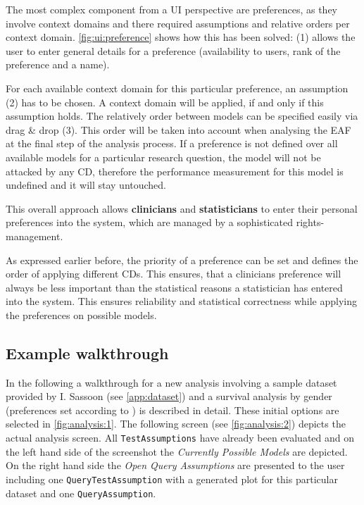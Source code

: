 The most complex component from a \gls{UI} perspective are preferences, as they involve context domains and there required assumptions and relative orders per context domain. \autoref{fig:ui:preference} shows how this has been solved: (1) allows the user to enter general details for a preference (availability to users, rank of the preference and a name). 

For each available context domain for this particular preference, an assumption (2) has to be chosen. A context domain will be applied, if and only if this assumption holds. The relatively order between models can be specified easily via drag \& drop (3). This order will be taken into account when analysing the \gls{EAF} at the final step of the analysis process. If a preference is not defined over all available models for a particular research question, the model will not be attacked by any \gls{CD}, therefore the performance measurement for this model is undefined and it will stay untouched.


This overall approach allows \textbf{clinicians} and \textbf{statisticians} to enter their personal preferences into the system, which are managed by a sophisticated rights-management. 

As expressed earlier before, the priority of a preference can be set and defines the order of applying different \glspl{CD}. This ensures, that a clinicians preference will always be less important than the statistical reasons a statistician has entered into the system. This ensures reliability and statistical correctness while applying the preferences on possible models.


\subsection{Example walkthrough}
\label{sub:walk}

In the following a walkthrough for a new analysis involving a sample dataset provided by I. Sassoon (see \autoref{app:dataset}) and a survival analysis by gender (preferences set according to \cite{sassoon2016CD}) is described in detail. These initial options are selected in \autoref{fig:analysis:1}. The following screen (see \autoref{fig:analysis:2}) depicts the actual analysis screen. All \texttt{TestAssumptions} have already been evaluated and on the left hand side of the screenshot the \textit{Currently Possible Models} are depicted. On the right hand side the \textit{Open Query Assumptions} are presented to the user including one \texttt{QueryTestAssumption} with a generated plot for this particular dataset and one \texttt{QueryAssumption}. 

